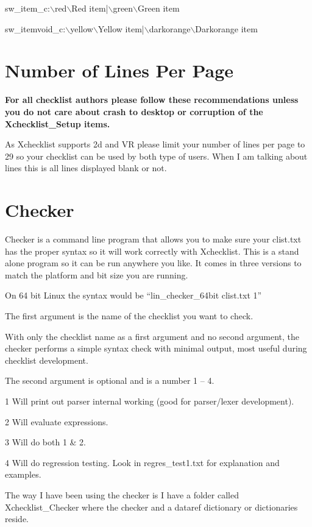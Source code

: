 \documentclass[11pt,parskip=half,a4paper]{scrartcl}
\begin{document}
sw\_item\_c:$\backslash$red$\backslash$Red item|$\backslash$green$\backslash$Green item

sw\_itemvoid\_c:$\backslash$yellow$\backslash$Yellow item|$\backslash$darkorange$\backslash$Darkorange item


\newpage
\section{Number of Lines Per Page}


\textbf{For all checklist authors please follow these recommendations unless you do not care about crash to desktop or corruption of the Xchecklist\_Setup items.}

As Xchecklist supports 2d and VR please limit your number of lines per page to 29 so your checklist can be used by both type of users. When I am talking about lines this is all lines displayed blank or not.

\newpage
\section{Checker}


Checker is a command line program that allows you to make sure your clist.txt has the proper syntax so it will work correctly with Xchecklist. This is a stand alone program so it can be run anywhere you like. It comes in three versions to match the platform and bit size you are running.

On 64 bit Linux the syntax would be ``lin\_checker\_64bit clist.txt 1''

The first argument is the name of the checklist you want to check.

With only the checklist name as a first argument and no second argument, the checker performs a simple syntax check with minimal output, most useful during checklist development.

The second argument is optional and is a number 1 -- 4.

1 Will print out parser internal working (good for parser/lexer development).

2 Will evaluate expressions.

3 Will do both 1 \& 2.

4 Will do regression testing. Look in regres\_test1.txt for explanation and examples.

The way I have been using the checker is I have a folder called Xchecklist\_Checker where the checker and a dataref dictionary or dictionaries reside.
\end{document}
